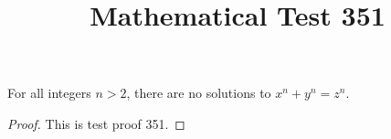 \documentclass{amsart}
\begin{document}
\title{Mathematical Test 351}
\begin{theorem}
For all integers $n > 2$, there are no solutions to $x^n + y^n = z^n$.
\end{theorem}
\begin{proof}
This is test proof 351.
\end{proof}
\end{document}
